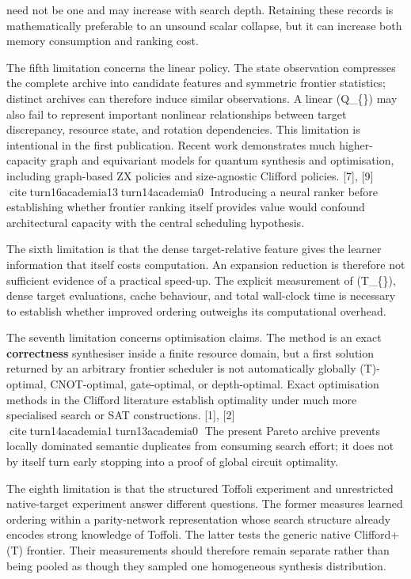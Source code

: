 \documentclass[
]{article}
\begin{document}
need not be one and may increase with search depth. Retaining these
records is mathematically preferable to an unsound scalar collapse, but
it can increase both memory consumption and ranking cost.

The fifth limitation concerns the linear policy. The state observation
compresses the complete archive into candidate features and symmetric
frontier statistics; distinct archives can therefore induce similar
observations. A linear (Q\_\{\boldsymbol\theta\}) may also fail to
represent important nonlinear relationships between target discrepancy,
resource state, and rotation dependencies. This limitation is
intentional in the first publication. Recent work demonstrates much
higher-capacity graph and equivariant models for quantum synthesis and
optimisation, including graph-based ZX policies and size-agnostic
Clifford policies. {[}7{]}, {[}9{]}
citeturn16academia13turn14academia0 Introducing a neural ranker
before establishing whether frontier ranking itself provides value would
confound architectural capacity with the central scheduling hypothesis.

The sixth limitation is that the dense target-relative feature gives the
learner information that itself costs computation. An expansion
reduction is therefore not sufficient evidence of a practical speed-up.
The explicit measurement of (T\_\{\}), dense target
evaluations, cache behaviour, and total wall-clock time is necessary to
establish whether improved ordering outweighs its computational
overhead.

The seventh limitation concerns optimisation claims. The method is an
exact \textbf{correctness} synthesiser inside a finite resource domain,
but a first solution returned by an arbitrary frontier scheduler is not
automatically globally (T)-optimal, CNOT-optimal, gate-optimal, or
depth-optimal. Exact optimisation methods in the Clifford literature
establish optimality under much more specialised search or SAT
constructions. {[}1{]}, {[}2{]} citeturn14academia1turn13academia0
The present Pareto archive prevents locally dominated semantic
duplicates from consuming search effort; it does not by itself turn
early stopping into a proof of global circuit optimality.

The eighth limitation is that the structured Toffoli experiment and
unrestricted native-target experiment answer different questions. The
former measures learned ordering within a parity-network representation
whose search structure already encodes strong knowledge of Toffoli. The
latter tests the generic native Clifford+(T) frontier. Their
measurements should therefore remain separate rather than being pooled
as though they sampled one homogeneous synthesis distribution.
\end{document}

